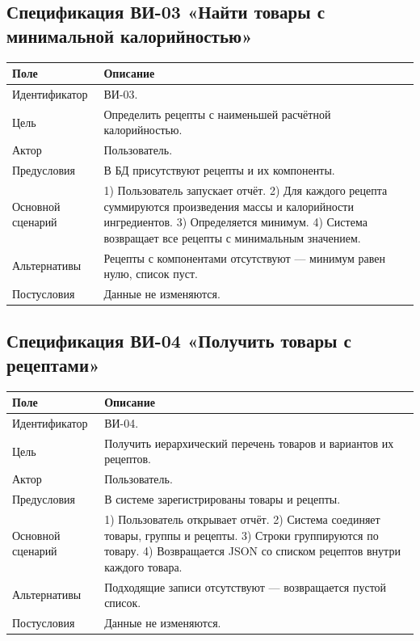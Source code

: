 \documentclass[14pt,a4paper]{extarticle}
\begin{document}
\subsection{Спецификация ВИ-03 «Найти товары с минимальной калорийностью»}

\begin{longtable}{L{0.25\textwidth} L{0.65\textwidth}}
\toprule
\textbf{Поле} & \textbf{Описание} \\
\midrule
\endhead
Идентификатор & ВИ-03. \\
Цель & Определить рецепты с наименьшей расчётной калорийностью. \\
Актор & Пользователь. \\
Предусловия & В БД присутствуют рецепты и их компоненты. \\
Основной сценарий & 1) Пользователь запускает отчёт. 2) Для каждого рецепта суммируются произведения массы и калорийности ингредиентов. 3) Определяется минимум. 4) Система возвращает все рецепты с минимальным значением. \\
Альтернативы & Рецепты с компонентами отсутствуют --- минимум равен нулю, список пуст. \\
Постусловия & Данные не изменяются. \\
\bottomrule
\end{longtable}

\subsection{Спецификация ВИ-04 «Получить товары с рецептами»}

\begin{longtable}{L{0.25\textwidth} L{0.65\textwidth}}
\toprule
\textbf{Поле} & \textbf{Описание} \\
\midrule
\endhead
Идентификатор & ВИ-04. \\
Цель & Получить иерархический перечень товаров и вариантов их рецептов. \\
Актор & Пользователь. \\
Предусловия & В системе зарегистрированы товары и рецепты. \\
Основной сценарий & 1) Пользователь открывает отчёт. 2) Система соединяет товары, группы и рецепты. 3) Строки группируются по товару. 4) Возвращается JSON со списком рецептов внутри каждого товара. \\
Альтернативы & Подходящие записи отсутствуют --- возвращается пустой список. \\
Постусловия & Данные не изменяются. \\
\bottomrule
\end{longtable}
\end{document}
